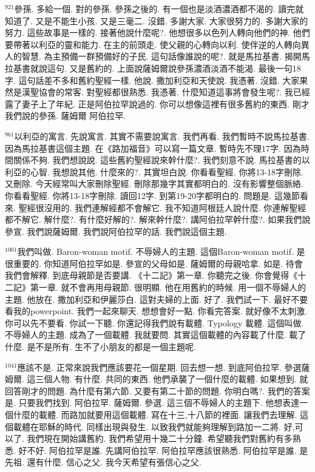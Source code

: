 \documentclass{book}
\begin{document}
$^{921}$參孫.
多給一個.
對的參孫.
參孫之後的.
有一個也是淡酒濃酒都不渴的.
讀完就知道了.
又是不能生小孩.
又是三毫二.
沒錯.
多謝大家.
大家很努力的.
多謝大家的努力.
這些故事是一樣的.
接著他說什麼呢?.
他想很多以色列人轉向他們的神.
他們要帶著以利亞的靈和能力.
在主的前頭走.
使父親的心轉向以利.
使伴逆的人轉向異人的智慧.
為主預備一群預備好的子民.
這句話像誰說的呢?.
就是馬拉基書.
揭開馬拉基書就說這句.
又是舊約的.
上面說薩姆爾說參孫濃酒淡酒不能渴.
最後一句18字.
這句話差不多和舊約聖經一樣.
他說.
撒加利亞和天使說.
我憑著.
沒錯.
大家果然是漢聖協會的常客.
對聖經都很熟悉.
我憑著.
什麼知道這事將會發生呢?.
我已經露了妻子上了年紀.
正是阿伯拉罕說過的.
你可以想像這裡有很多舊約的東西.
剛才我們說的參孫.
薩姆爾 阿伯拉罕.

$^{961}$以利亞的寓言.
先說寓言.
其實不需要說寓言.
我們再看.
我們暫時不說馬拉基書.
因為馬拉基書這個主題.
在《路加福音》可以寫一篇文章.
暫時先不理17字.
因為時間關係不夠.
我們想說說.
這些舊約聖經說來幹什麼?.
我們刻意不說.
馬拉基書的以利亞的心智.
我想說其他.
什麼來的?.
其實坦白說.
你看看聖經.
你將13-18字刪除.
又刪除.
今天經常叫大家刪除聖經.
刪除那幾字其實都明白的.
沒有影響整個脈絡.
你看看聖經.
你將13-18字刪除.
讀回12字.
到第19-20字都明白的.
問題是.
這幾節看來.
聖經很沒用的.
我們連解經都不會解它.
我不知道阿根廷人說什麼.
你連解聖經都不解它.
解什麼?.
有什麼好解的?.
解來幹什麼?.
講阿伯拉罕幹什麼?.
如果我們說參宣.
我們說薩姆爾.
我們說阿伯拉罕的話.
我們說這個主題.

$^{1001}$我們叫做.
Baron-woman motif.
不辱婦人的主題.
這個Baron-woman motif.
是很重要的.
你知道阿伯拉罕如是.
參宣的父母如是.
薩姆爾的母親哈拿.
如是.
待會我們會解釋.
到底母親節是否要講.
《十二記》第一章.
你聽完之後.
你會覺得《十二記》第一章.
就不會再用母親節.
很明顯.
他在用舊約的時候.
用一個不辱婦人的主題.
他放在.
撒加利亞和伊麗莎白.
這對夫婦的上面.
好了.
我們試一下.
最好不要看我的powerpoint.
我們一起來聊天.
想想會好一點.
你看完答案.
就好像不太刺激.
你可以先不要看.
你試一下聽.
你還記得我們說有載體.
Typology 載體.
這個叫做.
不辱婦人的主題.
成為了一個載體.
我就要問.
其實這個載體的內容載了什麼.
載了什麼.
是不是所有.
生不了小朋友的都是一個主題呢.

$^{1041}$應該不是.
正常來說我們應該要花一個星期.
回去想一想.
到底阿伯拉罕.
參選薩姆爾.
這三個人物.
有什麼.
共同的東西.
他們承襲了一個什麼的載體.
如果想到.
就回答剛才的問題.
為什麼有第六節.
又要有第二十節的問題.
你明白嗎?.
我們的答案是.
只要我們找到.
阿伯拉罕.
薩姆爾.
參選.
這三個不辱婦人的主題下.
他想表達一個什麼的載體.
而路加就要用這個載體.
寫在十三,十八節的裡面.
讓我們去理解.
這個載體在耶穌的時代.
同樣出現與發生.
以致我們就能夠理解到路加一二將.
好,可以了.
我們現在開始講舊約.
我們希望用十幾二十分鐘.
希望聽我們對舊約有多熟悉.
好不好.
阿伯拉罕是誰.
先講阿伯拉罕.
阿伯拉罕應該很熟悉.
阿伯拉罕是誰.
是先祖.
還有什麼.
信心之父.
我今天希望有張信心之父.
\end{document}
